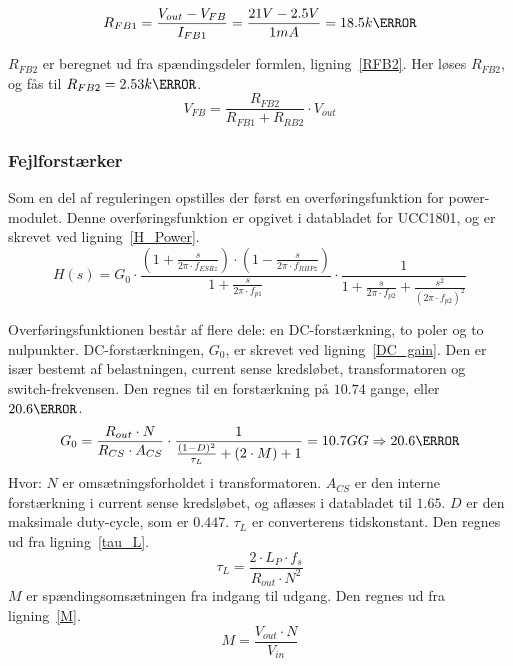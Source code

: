 \begin{equation} \label{RFB1}
R_{FB1} = \frac{V_{out}-V_{FB}}{I_{FB1}} = \frac{21V-2.5V}{1mA} = 18.5k\ohm
\end{equation}

\noindent $R_{FB2}$ er beregnet ud fra spændingsdeler formlen, ligning~\ref{RFB2}. Her løses $R_{FB2}$, og fås til $R_{FB2}=2.53k \ohm$.
\begin{equation} \label{RFB2}
V_{FB} = \frac{R_{FB2}}{R_{FB1} + R_{RB2}} \cdot V_{out}
\end{equation}


\subsubsection{Fejlforstærker}
Som en del af reguleringen opstilles der først en overføringsfunktion for power-modulet. Denne overføringsfunktion er opgivet i databladet for UCC1801, og er skrevet ved ligning~\ref{H_Power}.
\begin{equation} \label{H_Power}
H(s) = G_0 \cdot \frac{(1+\frac{s}{2\pi \cdot f_{ESRz}}) \cdot (1-\frac{s}{2\pi \cdot f_{RHPz}})}{1+\frac{s}{2\pi \cdot f_{p1}}} \cdot \frac{1}{1 + \frac{s}{2\pi \cdot f_{p2}} + \frac{s^2}{(2\pi \cdot f_{p2})^2}}
\end{equation}

Overføringsfunktionen består af flere dele: en DC-forstærkning, to poler og to nulpunkter. DC-forstærkningen, $G_0$, er skrevet ved ligning~\ref{DC_gain}. Den er især bestemt af belastningen, current sense kredsløbet, transformatoren og switch-frekvensen. Den regnes til en forstærkning på $10.74$ gange, eller $20.6\decibel$.
\begin{equation} \label{DC_gain}
G_0 = \frac{R_{out} \cdot N}{R_{CS} \cdot A_{CS}} \cdot \frac{1}{\frac{(1-D)^2}{\tau_L} + (2 \cdot M) + 1} = 10.7GG \Rightarrow 20.6\decibel
\end{equation}
\noindent Hvor:
\newline \noindent $N$ er omsætningsforholdet i transformatoren.
\newline \noindent $A_{CS}$ er den interne forstærkning i current sense kredsløbet, og aflæses i databladet til $1.65$.
\newline \noindent $D$ er den maksimale duty-cycle, som er $0.447$.
\newline \noindent $\tau_L$ er converterens tidskonstant. Den regnes ud fra ligning~\ref{tau_L}.
\begin{equation} \label{tau_L}
\tau_L = \frac{2 \cdot L_P \cdot f_s}{R_{out} \cdot N^2}
\end{equation}
\newline \noindent $M$ er spændingsomsætningen fra indgang til udgang. Den regnes ud fra ligning~\ref{M}.
\begin{equation} \label{M}
M = \frac{V_{out} \cdot N}{V_{in}}
\end{equation}

